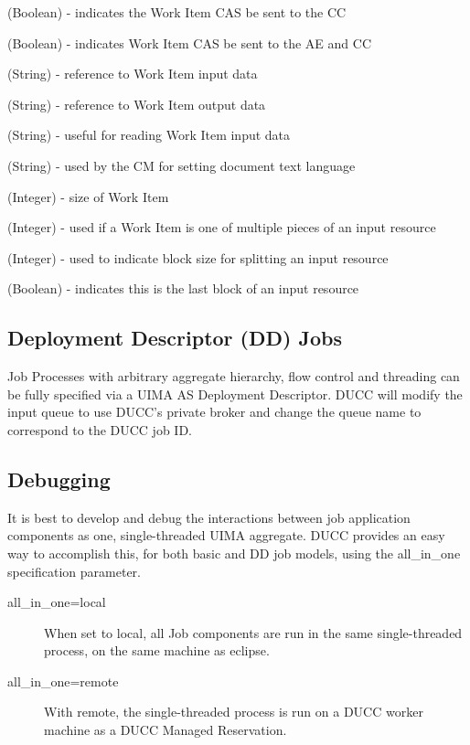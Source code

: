 \begin{description}[labelindent=0.5in,leftmargin=0.5in]
  \item[sendToLast] (Boolean) - indicates the Work Item CAS be sent to the CC
  \item[sendToAll] (Boolean) - indicates Work Item CAS be sent to the AE and CC
  \item[inputspec] (String) - reference to Work Item input data
  \item[outputspec] (String) - reference to Work Item output data
  \item[encoding] (String) - useful for reading Work Item input data
  \item[language] (String) - used by the CM for setting document text language
  \item[bytelength] (Integer) - size of Work Item
  \item[blockindex] (Integer) - used if a Work Item is one of multiple pieces of an input resource
  \item[blocksize] (Integer) - used to indicate block size for splitting an input resource
  \item[lastBlock] (Boolean) - indicates this is the last block of an input resource
\end{description}

\subsection{Deployment Descriptor (DD) Jobs}
Job Processes with arbitrary aggregate hierarchy, flow control and threading can be fully specified
via a UIMA AS Deployment Descriptor. DUCC will modify the input queue to use DUCC's private
broker and change the queue name to correspond to the DUCC job ID.

\subsection{Debugging}
It is best to develop and debug the interactions between job application components as one, 
single-threaded UIMA aggregate. DUCC provides an easy way to accomplish this, for both basic
and DD job models, using the all\_in\_one specification parameter.

\begin{description}
    \item[all\_in\_one=local] When set to local, all Job components are run in the same
      single-threaded process, on the same machine as eclipse.
    \item[all\_in\_one=remote] With remote, the single-threaded process is run on a DUCC
      worker machine as a DUCC Managed Reservation. 
\end{description}

